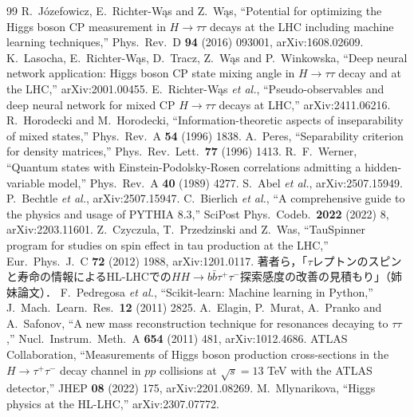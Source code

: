 \documentclass[paper=a4,fontsize=10pt,jafontsize=10pt,line_length=44zw,number_of_lines=46]{jlreq}
\begin{document}
\begin{thebibliography}{99}
 R.~Józefowicz, E.~Richter-Wąs and Z.~Wąs, ``Potential for optimizing the Higgs boson CP measurement in $H\to\tau\tau$ decays at the LHC including machine learning techniques,'' Phys.\ Rev.\ D \textbf{94} (2016) 093001, arXiv:1608.02609.
 K.~Lasocha, E.~Richter-Wąs, D.~Tracz, Z.~Wąs and P.~Winkowska, ``Deep neural network application: Higgs boson CP state mixing angle in $H\to\tau\tau$ decay and at the LHC,'' arXiv:2001.00455.
 E.~Richter-Wąs \textit{et al.}, ``Pseudo-observables and deep neural network for mixed CP $H\to\tau\tau$ decays at LHC,'' arXiv:2411.06216.
 R.~Horodecki and M.~Horodecki, ``Information-theoretic aspects of inseparability of mixed states,'' Phys.\ Rev.\ A \textbf{54} (1996) 1838.
 A.~Peres, ``Separability criterion for density matrices,'' Phys.\ Rev.\ Lett.\ \textbf{77} (1996) 1413.
 R.~F.~Werner, ``Quantum states with Einstein-Podolsky-Rosen correlations admitting a hidden-variable model,'' Phys.\ Rev.\ A \textbf{40} (1989) 4277.
 S.~Abel \textit{et al.}, arXiv:2507.15949.
 P.~Bechtle \textit{et al.}, arXiv:2507.15947.
 C.~Bierlich \textit{et al.}, ``A comprehensive guide to the physics and usage of PYTHIA 8.3,'' SciPost Phys.\ Codeb.\ \textbf{2022} (2022) 8, arXiv:2203.11601.
 Z.~Czyczula, T.~Przedzinski and Z.~Was, ``TauSpinner program for studies on spin effect in tau production at the LHC,'' Eur.\ Phys.\ J.\ C \textbf{72} (2012) 1988, arXiv:1201.0117.
 著者ら，「$\tau$レプトンのスピンと寿命の情報によるHL-LHCでの$HH\to b\bar b\tau^+\tau^-$探索感度の改善の見積もり」（姉妹論文）．
 F.~Pedregosa \textit{et al.}, ``Scikit-learn: Machine learning in Python,'' J.\ Mach.\ Learn.\ Res.\ \textbf{12} (2011) 2825.
 A.~Elagin, P.~Murat, A.~Pranko and A.~Safonov, ``A new mass reconstruction technique for resonances decaying to $\tau\tau$,'' Nucl.\ Instrum.\ Meth.\ A \textbf{654} (2011) 481, arXiv:1012.4686.
 ATLAS Collaboration, ``Measurements of Higgs boson production cross-sections in the $H\to\tau^+\tau^-$ decay channel in $pp$ collisions at $\sqrt s=13$ TeV with the ATLAS detector,'' JHEP \textbf{08} (2022) 175, arXiv:2201.08269.
 M.~Mlynarikova, ``Higgs physics at the HL-LHC,'' arXiv:2307.07772.
\end{thebibliography}
\end{document}

